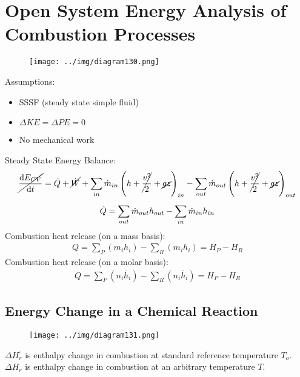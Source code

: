 \documentclass[class=report, crop=false, 12pt,a4paper]{standalone}
\numberwithin{equation}{section}
\begin{document}
\section{Open System Energy Analysis of Combustion Processes}
\begin{figure}[H]
  \centering
  \texttt{[image: ../img/diagram130.png]}
  \caption{}
\end{figure}
Assumptions:
\begin{itemize}[noitemsep]
  \item SSSF (steady state simple fluid)
  \item $\Delta KE = \Delta PE = 0$
  \item No mechanical work
\end{itemize}
Steady State Energy Balance:
\begin{gather}
  \cancel{\frac{\dif E_{CV}}{\dif t}} = \dot{Q} + \cancel{\dot{W}} + \sum_{in}\dot{m}_{in}\left(h+\cancel{\frac{v^2}{2}}+\cancel{gz}\right)_{in} - \sum_{out}\dot{m}_{out}\left(h+\cancel{\frac{v^2}{2}}+\cancel{gz}\right)_{out} \\[5pt]
  \dot{Q} = \sum_{out}\dot{m}_{out}h_{out} - \sum_{in}\dot{m}_{in}h_{in}
\end{gather}
Combustion heat release (on a mass basis):
\begin{gather}
  Q = \sum_{P}(m_i h_i) - \sum_{R}(m_i h_i) = H_P - H_R
\end{gather}
Combustion heat release (on a molar basis):
\begin{gather}
  Q = \sum_{P}(n_i \overline{h}_i) - \sum_{R}(n_i \overline{h}_i) = H_P - H_R
\end{gather}
\subsection{Energy Change in a Chemical Reaction}
\begin{figure}[H]
  \centering
  \texttt{[image: ../img/diagram131.png]}
  \caption{}
\end{figure}
$\Delta H_r^\circ$ is enthalpy change in combustion at standard reference temperature $T_o$. \\
$\Delta H_r$ is enthalpy change in combustion at an arbitrary temperature $T$.
\end{document}

